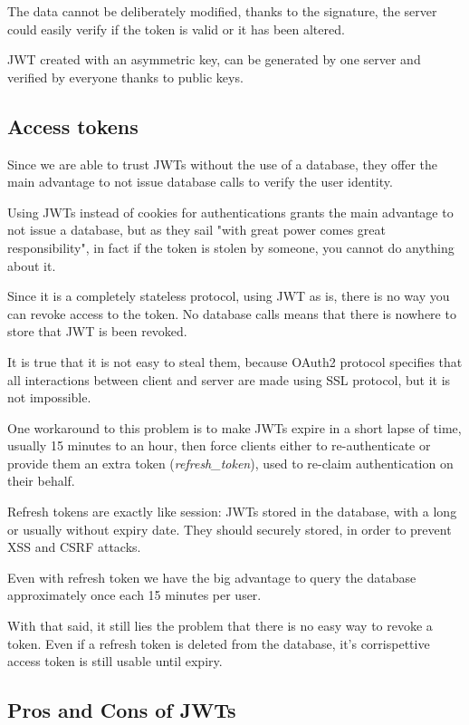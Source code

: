 \documentclass{style}
\begin{document}
The data cannot be deliberately modified, thanks to the signature, the server
could easily verify if the token is valid or it has been altered.

JWT created with an asymmetric key, can be generated by one server and verified
by everyone thanks to public keys.

\subsection{Access tokens}
Since we are able to trust JWTs  without the use of a database, they offer the
main advantage to not issue database calls to verify the user identity.


Using JWTs instead of cookies for authentications grants the main advantage to
not issue a database, but as they sail "with great power comes great
responsibility", in fact if the token is stolen by someone, you cannot do
anything about it.

Since it is a completely stateless protocol, using JWT as is, there is no way
you can revoke access to the token. No database calls means that there is
nowhere to store that JWT is been revoked.

It is true that it is not easy to steal them, because OAuth2 protocol specifies
that all interactions between client and server are made using SSL protocol, but
it is not impossible.

One workaround to this problem is to make JWTs expire in a short lapse of time,
usually 15 minutes to an hour, then force clients either to re-authenticate or
provide them an extra token (\textit{refresh\_token}), used to re-claim
authentication on their behalf.

Refresh tokens are exactly like session: JWTs stored in the database, with a
long or usually without expiry date.
They should securely stored, in order to prevent XSS and CSRF attacks.

Even with refresh token we have the big advantage to query the database
approximately once each 15 minutes per user.

With that said, it still lies the problem that there is no easy way to revoke a
token. Even if a refresh token is deleted from the database, it's corrispettive
access token is still usable until expiry.

\subsection{Pros and Cons of JWTs}
\end{document}

